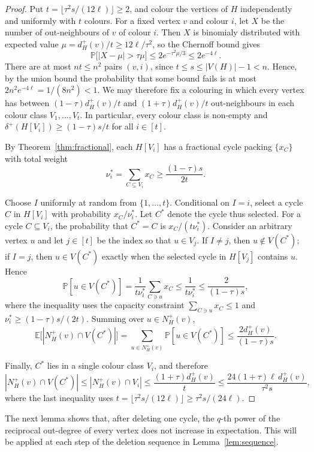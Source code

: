 \documentclass[a4paper,12pt]{article}
\numberwithin{equation}{section}
\begin{document}
\begin{proof}
Put $t=\lfloor\tau^2s/(12\ell)\rfloor\ge2$, and colour the vertices of
$H$ independently and uniformly with $t$ colours. For a fixed vertex
$v$ and colour $i$, let $X$ be the number of out-neighbours of $v$ of
colour $i$. Then $X$ is binomialy distributed with expected value
$\mu=d_H^+(v)/t\ge12\ell/\tau^2$, so the Chernoff bound  gives
$$
\mathbb P\bigl[|X-\mu|>\tau\mu\bigr]\le2e^{-\tau^2\mu/3}\le2e^{-4\ell}.
$$
There are at most $nt\le n^2$ pairs $(v,i)$, since
$t\le s\le|V(H)|-1<n$. Hence, by the union bound the probability that some bound fails is at
most $2n^2e^{-4\ell}=1/(8n^2)<1$. We may therefore fix a colouring in
which every vertex has between $(1-\tau)d_H^+(v)/t$ and
$(1+\tau)d_H^+(v)/t$ out-neighbours in each colour class
$V_1,\ldots,V_t$. In particular, every colour class is non-empty and
$\delta^+(H[V_i])\ge(1-\tau)s/t$ for all $i\in [t]$.

By Theorem~\ref{thm:fractional}, each $H[V_i]$ has a fractional cycle
packing $\{x_C\}$ with total weight
$$
\nu_i^\ast=\sum_{C\subseteq V_i}x_C\ge\frac{(1-\tau)s}{2t}.
$$

Choose $I$ uniformly at random from $\{1,\ldots,t\}$. Conditional on
$I=i$, select a cycle $C$ in $H[V_i]$ with probability $x_C/\nu_i^\ast$.
Let $C^\ast$ denote the cycle thus selected. For a cycle
$C\subseteq V_i$, the probability that $C^\ast=C$ is $x_C/(t\nu_i^\ast)$. Consider an arbitrary vertex $u$ and let $j\in [t]$ be the index so that $u\in V_j$. If $I\ne j$, then $u\notin V(C^\ast)$; if $I=j$, then
$u\in V(C^\ast)$ exactly when the selected cycle in $H[V_j]$ contains
$u$. Hence
$$
\mathbb P[u\in V(C^\ast)]
=\frac{1}{t\nu_i^\ast}\sum_{C\ni u}x_C
\le\frac{1}{t\nu_i^\ast}
\le\frac{2}{(1-\tau)s},
$$
where the inequality uses the capacity constraint
$\sum_{C\ni u}x_C\le1$ and $\nu_i^\ast\ge(1-\tau)s/(2t)$. Summing over
$u\in N_H^+(v)$,
$$
\mathbb E\bigl[|N_H^+(v)\cap V(C^\ast)|\bigr]
=\sum_{u\in N_H^+(v)}\mathbb P[u\in V(C^\ast)]
\le\frac{2d_H^+(v)}{(1-\tau)s}.
$$

Finally, $C^\ast$ lies in a single colour class $V_i$, and therefore
$$
|N_H^+(v)\cap V(C^\ast)|
\le |N_H^+(v)\cap V_i|
\le\frac{(1+\tau)d_H^+(v)}{t}
\le\frac{24(1+\tau)\ell\,d_H^+(v)}{\tau^2s},
$$
where the last inequality uses $t=\lfloor\tau^2s/(12\ell)\rfloor\ge\tau^2s/(24\ell)$.
\end{proof}


The next lemma shows that, after deleting one cycle, the $q$-th power of
the reciprocal out-degree of every vertex does not increase in
expectation. This will be applied at each step of the deletion sequence
in Lemma~\ref{lem:sequence}.
\end{document}
